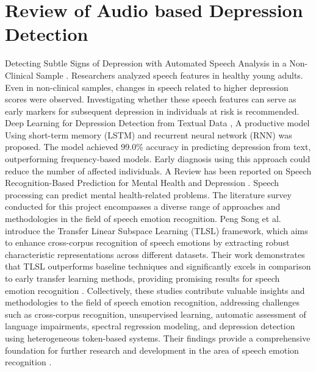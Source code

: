 \section{Review of Audio based Depression Detection}
Detecting Subtle Signs of Depression with Automated Speech Analysis in a Non-Clinical Sample \cite{konig2022detecting}. Researchers analyzed speech features in healthy young adults. Even in non-clinical samples, changes in speech related to higher depression scores were observed. Investigating whether these speech features can serve as early markers for subsequent depression in individuals at risk is recommended. Deep Learning for Depression Detection from Textual Data \cite{amanat2022deep}, A productive model Using short-term memory (LSTM) and recurrent neural network (RNN) was proposed. The model achieved 99.0\% accuracy in predicting depression from text, outperforming frequency-based models. Early diagnosis using this approach could reduce the number of affected individuals.
A Review has been reported on Speech Recognition-Based Prediction for Mental Health and Depression \cite{gaikwad2023speech}. Speech processing can predict mental health-related problems.
The literature survey conducted for this project encompasses a diverse range of approaches and methodologies in the field of speech emotion recognition. Peng Song et al. introduce the Transfer Linear Subspace Learning (TLSL) framework, which aims to enhance cross-corpus recognition of speech emotions by extracting robust characteristic representations across different datasets. Their work demonstrates that TLSL outperforms baseline techniques and significantly excels in comparison to early transfer learning methods, providing promising results for speech emotion recognition \cite{swain2018databases}.
Collectively, these studies contribute valuable insights and methodologies to the field of speech emotion recognition, addressing challenges such as cross-corpus recognition, unsupervised learning, automatic assessment of language impairments, spectral regression modeling, and depression detection using heterogeneous token-based systems. Their findings provide a comprehensive foundation for further research and development in the area of speech emotion recognition \cite{wani2021comprehensive}.
